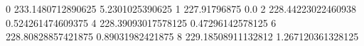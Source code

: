 0 233.1480712890625 5.2301025390625
1 227.91796875 0.0
2 228.44223022460938 0.524261474609375
4 228.39093017578125 0.47296142578125
6 228.80828857421875 0.89031982421875
8 229.18508911132812 1.267120361328125
